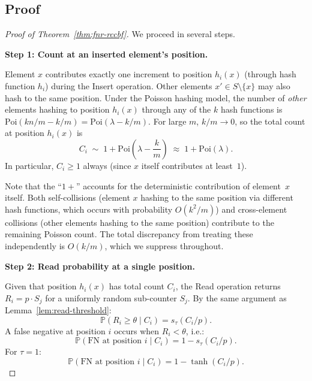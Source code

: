 \documentclass[11pt,a4paper]{article}
\newcommand{\Poi}{\mathrm{Poi}}
\newcommand{\Prob}{\mathbb{P}}
\begin{document}
\subsection{Proof}\label{ssec:fnr-proof}

\begin{proof}[Proof of Theorem~\ref{thm:fnr-rccbf}]
We proceed in several steps.

\medskip\noindent\textbf{Step 1: Count at an inserted element's position.}

Element $x$ contributes exactly one increment to position $h_i(x)$
(through hash function $h_i$) during the Insert operation.
Other elements $x' \in S \setminus \{x\}$ may also hash to the same
position.  Under the Poisson hashing model, the number of
\emph{other} elements hashing to position $h_i(x)$ through any of the $k$
hash functions is $\Poi(kn/m - k/m) = \Poi(\lambda - k/m)$.  For large
$m$, $k/m \to 0$, so the total count at position $h_i(x)$ is
\begin{equation}\label{eq:ci-dist}
  C_i \;\sim\; 1 + \Poi\!\left(\lambda - \frac{k}{m}\right)
  \;\approx\; 1 + \Poi(\lambda).
\end{equation}
In particular, $C_i \ge 1$ always (since $x$ itself contributes at
least~$1$).

Note that the ``$1+$'' accounts for the deterministic contribution of
element~$x$ itself.  Both self-collisions (element $x$ hashing to the same
position via different hash functions, which occurs with probability
$O(k^2/m)$) and cross-element collisions (other elements hashing to the
same position) contribute to the remaining Poisson count.  The total
discrepancy from treating these independently is $O(k/m)$, which we
suppress throughout.

\medskip\noindent\textbf{Step 2: Read probability at a single position.}

Given that position $h_i(x)$ has total count $C_i$, the Read operation
returns $R_i = p \cdot S_j$ for a uniformly random sub-counter $S_j$.
By the same argument as Lemma~\ref{lem:read-threshold}:
\begin{equation}\label{eq:read-xi}
  \Prob(R_i \ge \theta \mid C_i)
  = s_\tau(C_i / p).
\end{equation}
A false negative at position $i$ occurs when $R_i < \theta$, i.e.:
\begin{equation}\label{eq:fn-per-position}
  \Prob(\text{FN at position } i \mid C_i)
  = 1 - s_\tau(C_i/p).
\end{equation}
For $\tau = 1$:
\begin{equation}\label{eq:fn-per-position-tau1}
  \Prob(\text{FN at position } i \mid C_i)
  = 1 - \tanh(C_i/p).
\end{equation}


\end{proof}
\end{document}
